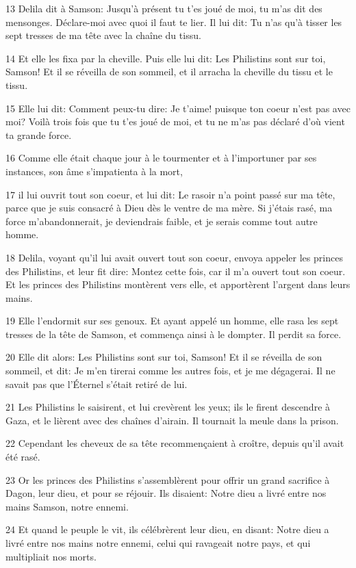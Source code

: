\par 13 Delila dit à Samson: Jusqu'à présent tu t'es joué de moi, tu m'as dit des mensonges. Déclare-moi avec quoi il faut te lier. Il lui dit: Tu n'as qu'à tisser les sept tresses de ma tête avec la chaîne du tissu.
\par 14 Et elle les fixa par la cheville. Puis elle lui dit: Les Philistins sont sur toi, Samson! Et il se réveilla de son sommeil, et il arracha la cheville du tissu et le tissu.
\par 15 Elle lui dit: Comment peux-tu dire: Je t'aime! puisque ton coeur n'est pas avec moi? Voilà trois fois que tu t'es joué de moi, et tu ne m'as pas déclaré d'où vient ta grande force.
\par 16 Comme elle était chaque jour à le tourmenter et à l'importuner par ses instances, son âme s'impatienta à la mort,
\par 17 il lui ouvrit tout son coeur, et lui dit: Le rasoir n'a point passé sur ma tête, parce que je suis consacré à Dieu dès le ventre de ma mère. Si j'étais rasé, ma force m'abandonnerait, je deviendrais faible, et je serais comme tout autre homme.
\par 18 Delila, voyant qu'il lui avait ouvert tout son coeur, envoya appeler les princes des Philistins, et leur fit dire: Montez cette fois, car il m'a ouvert tout son coeur. Et les princes des Philistins montèrent vers elle, et apportèrent l'argent dans leurs mains.
\par 19 Elle l'endormit sur ses genoux. Et ayant appelé un homme, elle rasa les sept tresses de la tête de Samson, et commença ainsi à le dompter. Il perdit sa force.
\par 20 Elle dit alors: Les Philistins sont sur toi, Samson! Et il se réveilla de son sommeil, et dit: Je m'en tirerai comme les autres fois, et je me dégagerai. Il ne savait pas que l'Éternel s'était retiré de lui.
\par 21 Les Philistins le saisirent, et lui crevèrent les yeux; ils le firent descendre à Gaza, et le lièrent avec des chaînes d'airain. Il tournait la meule dans la prison.
\par 22 Cependant les cheveux de sa tête recommençaient à croître, depuis qu'il avait été rasé.
\par 23 Or les princes des Philistins s'assemblèrent pour offrir un grand sacrifice à Dagon, leur dieu, et pour se réjouir. Ils disaient: Notre dieu a livré entre nos mains Samson, notre ennemi.
\par 24 Et quand le peuple le vit, ils célébrèrent leur dieu, en disant: Notre dieu a livré entre nos mains notre ennemi, celui qui ravageait notre pays, et qui multipliait nos morts.
